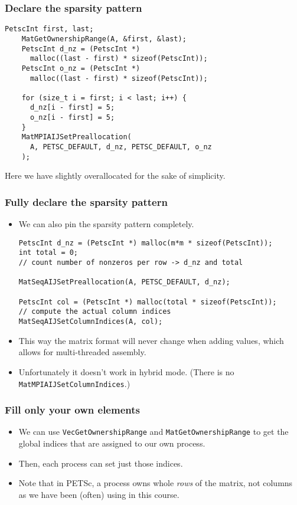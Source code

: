 \begin{frame}[fragile]
  \frametitle{Declare the sparsity pattern}
  \begin{lstlisting}[style=c, basicstyle=\ttfamily\scriptsize]
    PetscInt first, last;
    MatGetOwnershipRange(A, &first, &last);
    PetscInt d_nz = (PetscInt *)
      malloc((last - first) * sizeof(PetscInt));
    PetscInt o_nz = (PetscInt *)
      malloc((last - first) * sizeof(PetscInt));

    for (size_t i = first; i < last; i++) {
      d_nz[i - first] = 5;
      o_nz[i - first] = 5;
    }
    MatMPIAIJSetPreallocation(
      A, PETSC_DEFAULT, d_nz, PETSC_DEFAULT, o_nz
    );
  \end{lstlisting}
  Here we have slightly overallocated for the sake of simplicity.
\end{frame}

\begin{frame}[fragile]
  \frametitle{Fully declare the sparsity pattern}
  \begin{itemize}
  \item We can also pin the sparsity pattern completely.
    \begin{lstlisting}[style=c, basicstyle=\ttfamily\scriptsize]
PetscInt d_nz = (PetscInt *) malloc(m*m * sizeof(PetscInt));
int total = 0;
// count number of nonzeros per row -> d_nz and total

MatSeqAIJSetPreallocation(A, PETSC_DEFAULT, d_nz);

PetscInt col = (PetscInt *) malloc(total * sizeof(PetscInt));
// compute the actual column indices
MatSeqAIJSetColumnIndices(A, col);
    \end{lstlisting}
  \item This way the matrix format will never change when adding values, which
    allows for multi-threaded assembly.
  \item Unfortunately it doesn't work in hybrid mode. (There is no
    \texttt{MatMPIAIJSetColumnIndices}.)
  \end{itemize}
\end{frame}

\begin{frame}
  \frametitle{Fill only your own elements}
  \begin{itemize}
  \item We can use \texttt{VecGetOwnershipRange} and
    \texttt{MatGetOwnershipRange} to get the global indices that are assigned to
    our own process.
  \item Then, each process can set just those indices.
  \item Note that in PETSc, a process owns whole \emph{rows} of the matrix, not
    columns as we have been (often) using in this course.
  \end{itemize}
\end{frame}


